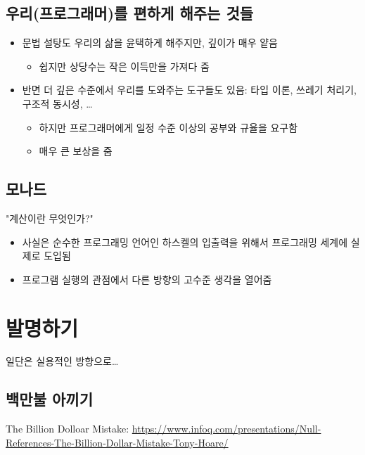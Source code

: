 \documentclass[a4paper,11pt]{article}
\begin{document}
\subsection{우리(프로그래머)를 편하게 해주는 것들}
\label{sec:org97cd77e}
\begin{itemize}
\item 문법 설탕도 우리의 삶을 윤택하게 해주지만, 깊이가 매우 얕음
\begin{itemize}
\item 쉽지만 상당수는 작은 이득만을 가져다 줌
\end{itemize}
\item 반면 더 깊은 수준에서 우리를 도와주는 도구들도 있음: 타입 이론, 쓰레기 처리기, 구조적 동시성, \ldots{}
\begin{itemize}
\item 하지만 프로그래머에게 일정 수준 이상의 공부와 규율을 요구함
\item 매우 큰 보상을 줌
\end{itemize}
\end{itemize}

\subsection{모나드}
\label{sec:orgced337a}
"계산이란 무엇인가?"
\begin{itemize}
\item 사실은 순수한 프로그래밍 언어인 하스켈의 입출력을 위해서 프로그래밍 세계에 실제로 도입됨
\item 프로그램 실행의 관점에서 다른 방향의 고수준 생각을 열어줌
\end{itemize}

\section{발명하기}
\label{sec:org50a407f}
일단은 실용적인 방향으로\ldots{}

\subsection{백만불 아끼기}
\label{sec:orgf03e1da}
The Billion Dolloar Mistake:
\url{https://www.infoq.com/presentations/Null-References-The-Billion-Dollar-Mistake-Tony-Hoare/}
\end{document}
